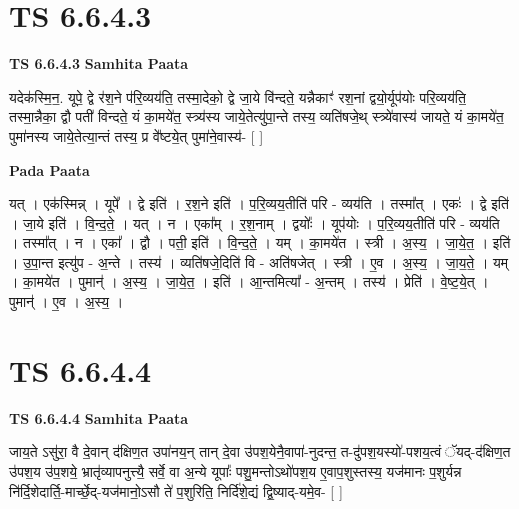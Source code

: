 \documentclass[17pt]{extarticle}
\begin{document}

\section{ TS 6.6.4.3 }

\textbf{TS 6.6.4.3 } \newline
\textbf{Samhita Paata} \newline

यदेक॑स्मि॒न॒. यूपे॒ द्वे र॑श॒ने प॑रि॒व्यय॑ति॒ तस्मा॒देको॒ द्वे जा॒ये वि॑न्दते॒ यन्नैकाꣳ॑ रश॒नां द्वयो॒र्यूप॑योः परि॒व्यय॑ति॒ तस्मा॒न्नैका॒ द्वौ पती॑ विन्दते॒ यं का॒मये॑त॒ स्त्र्य॑स्य जाये॒तेत्यु॑पा॒न्ते तस्य॒ व्यति॑षजे॒थ् स्त्र्ये॑वास्य॑ जायते॒ यं का॒मये॑त॒ पुमा॑नस्य जाये॒तेत्या॒न्तं तस्य॒ प्र वे᳚ष्टये॒त् पुमा॑ने॒वास्य॑- [  ] \newline

\textbf{Pada Paata} \newline

यत् । एक॑स्मिन्न् । यूपे᳚ । द्वे इति॑ । र॒श॒ने इति॑ । प॒रि॒व्यय॒तीति॑ परि - व्यय॑ति । तस्मा᳚त् । एकः॑ । द्वे इति॑ । जा॒ये इति॑ । वि॒न्द॒ते॒ । यत् । न । एका᳚म् । र॒श॒नाम् । द्वयोः᳚ । यूप॑योः । प॒रि॒व्यय॒तीति॑ परि - व्यय॑ति । तस्मा᳚त् । न । एका᳚ । द्वौ । पती॒ इति॑ । वि॒न्द॒ते॒ । यम् । का॒मये॑त । स्त्री । अ॒स्य॒ । जा॒ये॒त॒ । इति॑ । उ॒पा॒न्त इत्यु॑प - अ॒न्ते । तस्य॑ । व्यति॑षजे॒दिति॑ वि - अति॑षजेत् । स्त्री । ए॒व । अ॒स्य॒ । जा॒य॒ते॒ । यम् । का॒मये॑त । पुमान्॑ । अ॒स्य॒ । जा॒ये॒त॒ । इति॑ । आ॒न्तमित्या᳚ - अ॒न्तम् । तस्य॑ । प्रेति॑ । वे॒ष्ट॒ये॒त् । पुमान्॑ । ए॒व । अ॒स्य॒ ।  \newline





\section{ TS 6.6.4.4 }

\textbf{TS 6.6.4.4 } \newline
\textbf{Samhita Paata} \newline

जाय॒ते ऽसु॑रा॒ वै दे॒वान् द॑क्षिण॒त उपा॑नय॒न् तान् दे॒वा उ॑पश॒येनै॒वापा॑-नुदन्त॒ त-दु॑पश॒यस्यो॑-पशय॒त्वं ॅयद्-द॑क्षिण॒त उ॑पश॒य उ॑प॒शये॒ भ्रातृ॑व्यापनुत्त्यै॒ सर्वे॒ वा अ॒न्ये यूपाः᳚ पशु॒मन्तोऽथो॑पश॒य ए॒वाप॒शुस्तस्य॒ यज॑मानः प॒शुर्यन्न नि॑र्दि॒शेदार्ति॒-मार्च्छे॒द्-यज॑मानो॒ऽसौ ते॑ प॒शुरिति॒ निर्दि॑शे॒द्यं द्वि॒ष्याद्-यमे॒व- [  ] \newline
\end{document}
